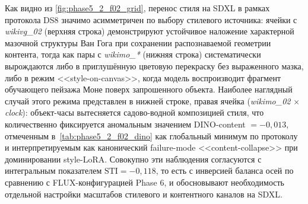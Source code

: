 Как видно из \autoref{fig:phase5_2_f02_grid}, перенос стиля на SDXL в рамках протокола DS8 значимо асимметричен по выбору стилевого источника: ячейки с \textit{wikivg\_02} (верхняя строка) демонстрируют устойчивое наложение характерной мазочной структуры Ван Гога при сохранении распознаваемой геометрии контента, тогда как пары с \textit{wikimo\_*} (нижняя строка) систематически вырождаются либо в приглушённую цветовую перекраску без выраженного мазка, либо в режим <<style-on-canvas>>, когда модель воспроизводит фрагмент обучающего пейзажа Моне поверх запрошенного объекта. Наиболее наглядный случай этого режима представлен в нижней строке, правая ячейка (\textit{wikimo\_02} $\times$ \textit{clock}): объект-часы вытесняется садово-водной композицией стиля, что количественно фиксируется аномальным значением DINO-content $= -0{,}013$, отмеченным в~\autoref{tab:phase5_2_f02_dino} как глобальный минимум по протоколу и интерпретируемым как канонический failure-mode <<content-collapse>> при доминировании style-LoRA. Совокупно эти наблюдения согласуются с интегральным показателем $\mathrm{STI} = -0{,}118$, то есть с инверсией баланса осей по сравнению с FLUX-конфигурацией Phase 6, и обосновывают необходимость отдельной настройки масштабов стилевого и контентного каналов на SDXL.
